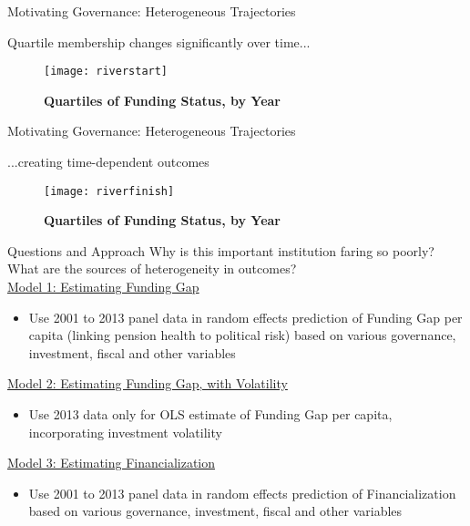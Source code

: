 \documentclass{beamer}
\begin{document}
\begin{frame}{\textmd{Motivating Governance: Heterogeneous Trajectories}}
\begin{small}
Quartile membership changes significantly over time...
\end{small}	
\begin{figure}
\caption*{\textbf{Quartiles of Funding Status, by Year}} 	
\texttt{[image: riverstart]}
\end{figure}
\end{frame}

\begin{frame}{\textmd{Motivating Governance: Heterogeneous Trajectories}}
\begin{small}
...creating time-dependent outcomes
\end{small}
\begin{figure}
\caption*{\textbf{Quartiles of Funding Status, by Year}} 	
\texttt{[image: riverfinish]}
\end{figure}
\end{frame}

\begin{frame}{\textmd{Questions and Approach}}
Why is this important institution faring so poorly? What are the sources of heterogeneity in outcomes? \\
\bigskip
\underline{Model 1: Estimating Funding Gap}
\begin{scriptsize}
\begin{itemize}
\item Use 2001 to 2013 panel data in random effects prediction of Funding Gap per capita (linking pension health to political risk) based on various governance, investment, fiscal and other variables
\end{itemize}
\end{scriptsize}
\underline{Model 2: Estimating Funding Gap, with Volatility}
\begin{scriptsize}
\begin{itemize}
\item Use 2013 data only for OLS estimate of Funding Gap per capita, incorporating investment volatility
\end{itemize}
\end{scriptsize}
\underline{Model 3: Estimating Financialization}
\begin{scriptsize}
\begin{itemize}
\item Use 2001 to 2013 panel data in random effects prediction of Financialization based on various governance, investment, fiscal and other variables
\end{itemize}
\end{scriptsize}
\end{frame}
\end{document}
